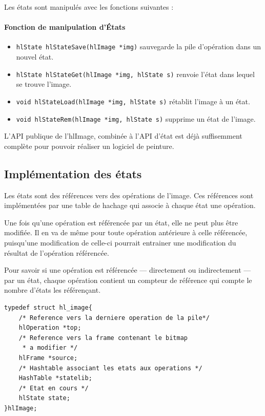 		Les états sont manipulés avec les fonctions suivantes :
		\paragraph{Fonction de manipulation d'États}
		\begin{itemize}
			\item \lstinline$hlState hlStateSave(hlImage *img)$ sauvegarde la pile d'opération dans un nouvel état. 
			\item \lstinline$hlState hlStateGet(hlImage *img, hlState s)$ renvoie l'état dans lequel se trouve l'image.
			\item \lstinline$void hlStateLoad(hlImage *img, hlState s)$ rétablit l'image à un état. 
			\item \lstinline$void hlStateRem(hlImage *img, hlState s)$ supprime un état de l'image. 
		\end{itemize}

		L'API publique de l'hlImage, combinée à l'API d'état est déjà suffisemment complète pour pouvoir réaliser  un logiciel de peinture. 
		
		\subsection{Implémentation des états}
			Les états sont des références vers des opérations de l'image. Ces références sont implémentées par une table de hachage qui
			associe à chaque état une opération. 

			Une fois qu'une opération est référencée par un état, elle ne peut plus être modifiée. Il en va de même pour toute opération
			antérieure à celle référencée, puisqu'une modification de celle-ci pourrait entrainer une modification du résultat de l'opération 
			référencée.

			Pour savoir si une opération est référencée --- directement ou indirectement --- par un état, chaque opération contient un
			compteur de référence qui compte le nombre d'états les référençant. 

		\begin{lstlisting}[float,caption={Définition des hlImages avec états },frame=tb,label=lsthlImage2]
typedef struct hl_image{
	/* Reference vers la derniere operation de la pile*/
	hlOperation *top;
	/* Reference vers la frame contenant le bitmap 
	 * a modifier */
	hlFrame *source;
	/* Hashtable associant les etats aux operations */
	HashTable *statelib;
	/* Etat en cours */
	hlState state;
}hlImage;
		\end{lstlisting}

